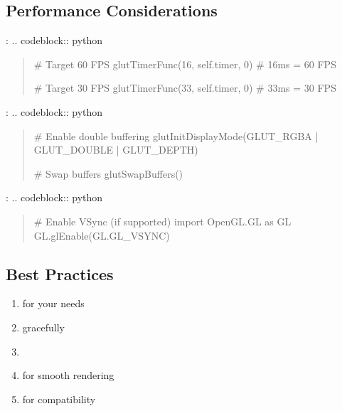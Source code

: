 \documentclass[a4paper,10pt,english,openany,oneside]{sphinxmanual}
\begin{document}
\subsection{Performance Considerations}
\label{\detokenize{api/ui:performance-considerations}}
\sphinxAtStartPar
{}:
.. code\sphinxhyphen{}block:: python
\begin{quote}

\sphinxAtStartPar
\# Target 60 FPS
glutTimerFunc(16, self.timer, 0)  \# 16ms = 60 FPS

\sphinxAtStartPar
\# Target 30 FPS
glutTimerFunc(33, self.timer, 0)  \# 33ms = 30 FPS
\end{quote}

\sphinxAtStartPar
{}:
.. code\sphinxhyphen{}block:: python
\begin{quote}

\sphinxAtStartPar
\# Enable double buffering
glutInitDisplayMode(GLUT\_RGBA | GLUT\_DOUBLE | GLUT\_DEPTH)

\sphinxAtStartPar
\# Swap buffers
glutSwapBuffers()
\end{quote}

\sphinxAtStartPar
{}:
.. code\sphinxhyphen{}block:: python
\begin{quote}

\sphinxAtStartPar
\# Enable VSync (if supported)
import OpenGL.GL as GL
GL.glEnable(GL.GL\_VSYNC)
\end{quote}


\subsection{Best Practices}
\label{\detokenize{api/ui:best-practices}}\begin{enumerate}
%
\item {} 
\sphinxAtStartPar
{} for your needs

\item {} 
\sphinxAtStartPar
{} gracefully

\item {} 
\sphinxAtStartPar
{}

\item {} 
\sphinxAtStartPar
{} for smooth rendering

\item {} 
\sphinxAtStartPar
{} for compatibility

\end{enumerate}
\end{document}
